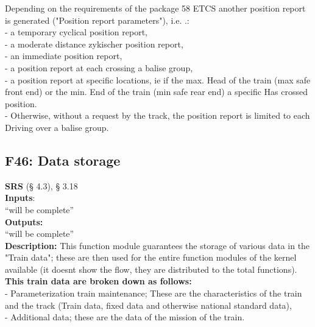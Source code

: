 \documentclass{template/openetcs_report}
\begin{document}
Depending on the requirements of the package 58 ETCS another position report is generated 
("Position report parameters"), i.e. .: \\
 
- a temporary cyclical position report, \\

- a moderate distance zykischer position report, \\

- an immediate position report, \\

- a position report at each crossing a balise group, \\

- a position report at specific locations, ie if the max. Head of the train 
(max safe front end) or the min. End of the train (min safe rear end) a specific 
Has crossed position. \\

- Otherwise, without a request by the track, the position report is limited to each 
Driving over a balise group.\\

\subsection {F46: Data storage}
\textbf{SRS} (§ 4.3), § 3.18\\

\textbf{Inputs}:\\
``will be complete''\\
 
 \textbf{Outputs:}\\
 ``will be complete''\\
 
 \textbf{Description:} 
This function module guarantees the storage of various data in the 
"Train data"; these are then used for the entire function modules of the kernel available (it doesnt show the flow, they are distributed to the total functions).\\
 
\textbf{This train data are broken down as follows:}\\ 

- Parameterization train maintenance; These are the characteristics of the train and the track 
(Train data, fixed data and otherwise national standard data),\\
 
- Additional data; these are the data of the mission of the train. \\
\end{document}
